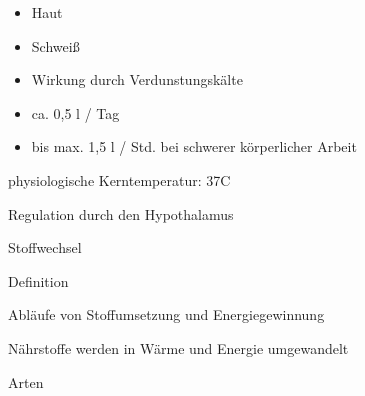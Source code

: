 \documentclass{article}
\begin{document}
\begin{itemize}
\item {\mdseries
Haut}

\item {\mdseries
Schwei{\ss}}

\end{itemize}
\begin{itemize}
\item {\mdseries
Wirkung durch Verdunstungsk\"alte}

\item {\mdseries
ca. 0,5 l / Tag}

\item {\mdseries
bis max. 1,5 l / Std. bei schwerer k\"orperlicher  Arbeit}

\end{itemize}
{\mdseries
physiologische Kerntemperatur: 37{\textdegree}C}

{\mdseries
Regulation durch den Hypothalamus}

{\mdseries\color[rgb]{0.0,0.0,0.5019608}
Stoffwechsel}

{\mdseries\color{black}
 Definition }

{\mdseries
Abl\"aufe von Stoffumsetzung und  Energiegewinnung}

{\mdseries
N\"ahrstoffe werden in W\"arme und Energie  umgewandelt}

{\mdseries\color{black}
Arten}
\end{document}
